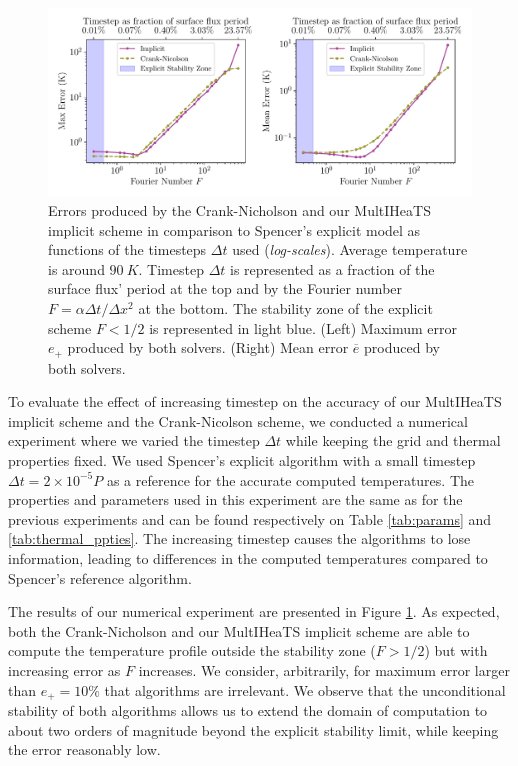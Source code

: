 \documentclass[sn-vancouver, Numbered]{sn-jnl}
\begin{document}
\begin{figure}[htpb]
	\centering
	\includegraphics[width=1.0\textwidth]{solver_compare.pdf}
	\caption{Errors produced by the Crank-Nicholson and our MultIHeaTS implicit scheme in comparison to Spencer's explicit model as functions of the timesteps $\Delta t$ used (\textit{log-scales}). Average temperature is around $\SI{90}{K}$. Timestep $\Delta t$ is represented as a fraction of the surface flux' period at the top and by the Fourier number $F=\alpha \Delta t / \Delta x^2$ at the bottom. The stability zone of the explicit scheme $F< 1/2$ is represented in light blue. (Left) Maximum error $e_+$ produced by both solvers. (Right) Mean error $\overline{e}$ produced by both solvers. 
 }
	\label{fig:solvers_comp}
\end{figure}

To evaluate the effect of increasing timestep on the accuracy of our MultIHeaTS implicit scheme and the Crank-Nicolson scheme, we conducted a numerical experiment where we varied the timestep $\Delta t$ while keeping the grid and thermal properties fixed. We used Spencer's explicit algorithm with a small timestep $\Delta t = 2 \times 10^{-5}  P $ as a reference for the accurate computed temperatures. The properties and parameters used in this experiment are the same as for the previous experiments and can be found respectively on Table \ref{tab:params} and \ref{tab:thermal_ppties}. The increasing timestep causes the algorithms to lose information, leading to differences in the computed temperatures compared to Spencer's reference algorithm.




The results of our numerical experiment are presented in Figure \ref{fig:solvers_comp}. As expected, both the Crank-Nicholson and our MultIHeaTS implicit scheme are able to compute the temperature profile outside the stability zone ($F> 1/2$) but with increasing error as $F$ increases. 
We consider, arbitrarily, for maximum error larger than  $e_+ = 10 \%$ that algorithms are irrelevant.
We observe that the unconditional stability of both algorithms allows us to extend the domain of computation to about two orders of magnitude beyond the explicit stability limit, while keeping the error reasonably low. 
\end{document}
